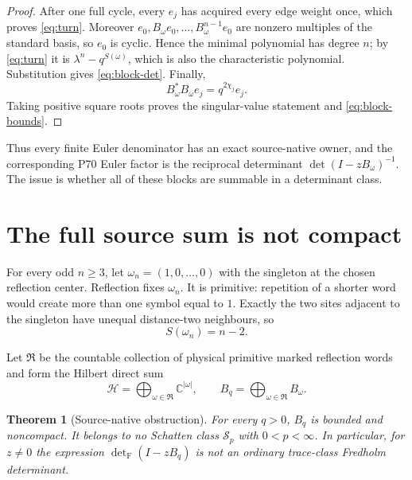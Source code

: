 \documentclass[11pt]{article}
\newtheorem{theorem}{Theorem}[section]
\newcommand{\Fdet}{\det_{\mathrm F}}
\begin{document}
\begin{proof}
After one full cycle, every $e_j$ has acquired every edge weight once, which
proves \eqref{eq:turn}.  Moreover
$e_0,B_\omega e_0,\ldots,B_\omega^{n-1}e_0$ are nonzero multiples of the
standard basis, so $e_0$ is cyclic.  Hence the minimal polynomial has degree
$n$; by \eqref{eq:turn} it is $\lambda^n-q^{S(\omega)}$, which is also the
characteristic polynomial.  Substitution gives \eqref{eq:block-det}.
Finally,
\[
 B_\omega^*B_\omega e_j=q^{2\chi_j}e_j.
\]
Taking positive square roots proves the singular-value statement and
\eqref{eq:block-bounds}.
\end{proof}

Thus every finite Euler denominator has an exact source-native owner, and
the corresponding P70 Euler factor is the reciprocal determinant
\(\det(I-zB_\omega)^{-1}\).  The issue is whether all of these blocks are
summable in a determinant class.

\section{The full source sum is not compact}

For every odd $n\geq3$, let $\omega_n=(1,0,\ldots,0)$ with the singleton at
the chosen reflection center.  Reflection fixes $\omega_n$.  It is
primitive: repetition of a shorter word would create more than one symbol
equal to $1$.  Exactly the two sites adjacent to the singleton have unequal
distance-two neighbours, so
\begin{equation}\label{eq:singleton-energy}
 S(\omega_n)=n-2.
\end{equation}

Let $\mathfrak R$ be the countable collection of physical primitive marked
reflection words and form the Hilbert direct sum
\begin{equation}\label{eq:direct-sum}
 \mathcal H=\bigoplus_{\omega\in\mathfrak R}\mathbb C^{|\omega|},
 \qquad B_q=\bigoplus_{\omega\in\mathfrak R}B_\omega.
\end{equation}

\begin{theorem}[Source-native obstruction]\label{thm:obstruction}
For every $q>0$, $B_q$ is bounded and noncompact.  It belongs to no Schatten
class $\mathcal S_p$ with $0<p<\infty$.  In particular, for $z\ne0$ the
expression $\Fdet(I-zB_q)$ is not an ordinary trace-class Fredholm
determinant.
\end{theorem}
\end{document}
